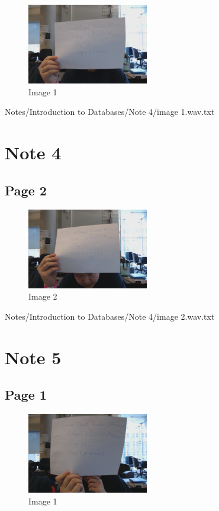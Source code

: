 \documentclass{article}%
\begin{document}
\begin{figure}[h!]%
\centering%
\includegraphics[width=200px]{Notes/Introduction to Databases/Note 4/image 1.jpg}%
\caption{Image 1}%
\end{figure}

%
Notes/Introduction to Databases/Note 4/image 1.wav.txt

%
\section{Note 4}%
\label{sec:Note 4}%
\subsection{Page 2}%
\label{subsec:Page 2}%


\begin{figure}[h!]%
\centering%
\includegraphics[width=200px]{Notes/Introduction to Databases/Note 4/image 2.jpg}%
\caption{Image 2}%
\end{figure}

%
Notes/Introduction to Databases/Note 4/image 2.wav.txt

%
\section{Note 5}%
\label{sec:Note 5}%
\subsection{Page 1}%
\label{subsec:Page 1}%


\begin{figure}[h!]%
\centering%
\includegraphics[width=200px]{Notes/Introduction to Databases/Note 5/image 1.jpg}%
\caption{Image 1}%
\end{figure}
\end{document}

